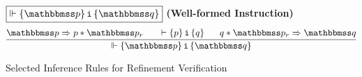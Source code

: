 \begin{figure*}[!t]
    \subfigure
    {
        \begin{minipage}{1\textwidth}
            $\boxed{\relwfins{\relastP}{\simplins{}}{\relastQ}}$
            \qquad
            \textbf{(Well-formed Instruction)}
            \[
                \infer
                {
                    \relwfins{\relastP}{\simplins{}}{\relastQ}
                }
                {
                    \relastP \Rightarrow 
                        \astP \sepstar \relastP_r 
                    \quad \ \ 
                    \wfins{\astP}{\simplins{}}{\astQ}
                    \quad \ \ 
                    \astQ \sepstar \relastP_r \Rightarrow 
                        \relastQ  
                }
            \]
        \end{minipage}
    }
    \caption{Selected Inference Rules for Refinement Verification}
    \label{fig:Selected Inference Rules for Refinement Verification}
\end{figure*}

